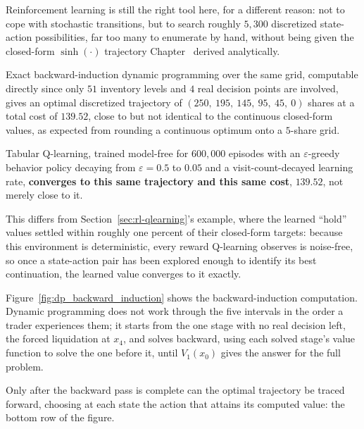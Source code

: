 \documentclass[../ai_in_finance]{subfiles}
\begin{document}
Reinforcement learning is still the right tool here, for a different reason: not to cope with stochastic transitions, but to search roughly $5{,}300$ discretized state-action possibilities, far too many to enumerate by hand, without being given the closed-form $\sinh(\cdot)$ trajectory Chapter~ derived analytically.

Exact backward-induction dynamic programming over the same grid, computable directly since only $51$ inventory levels and $4$ real decision points are involved, gives an optimal discretized trajectory of $(250,\ 195,\ 145,\ 95,\ 45,\ 0)$ shares at a total cost of $139.52$, close to but not identical to the continuous closed-form values, as expected from rounding a continuous optimum onto a $5$-share grid.

Tabular Q-learning, trained model-free for $600{,}000$ episodes with an $\varepsilon$-greedy behavior policy decaying from $\varepsilon=0.5$ to $0.05$ and a visit-count-decayed learning rate, \textbf{converges to this same trajectory and this same cost}, $139.52$, not merely close to it.

This differs from Section~\ref{sec:rl-qlearning}'s example, where the learned ``hold'' values settled within roughly one percent of their closed-form targets: because this environment is deterministic, every reward Q-learning observes is noise-free, so once a state-action pair has been explored enough to identify its best continuation, the learned value converges to it exactly.

Figure~\ref{fig:dp_backward_induction} shows the backward-induction computation. Dynamic programming does not work through the five intervals in the order a trader experiences them; it starts from the one stage with no real decision left, the forced liquidation at $x_4$, and solves backward, using each solved stage's value function to solve the one before it, until $V_1(x_0)$ gives the answer for the full problem.

Only after the backward pass is complete can the optimal trajectory be traced forward, choosing at each state the action that attains its computed value: the bottom row of the figure.
\end{document}
